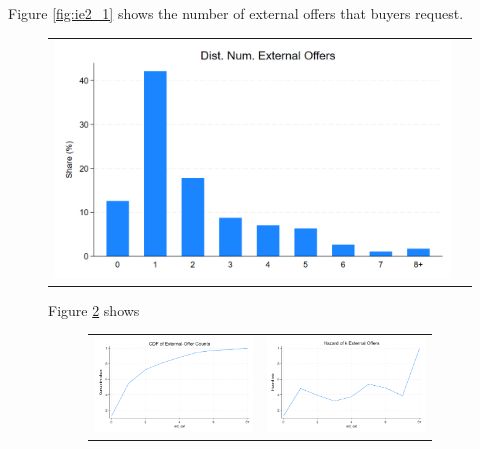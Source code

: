 \documentclass[12pt]{article}
\begin{document}
Figure \ref{fig:ie2_1} shows the number of external offers that buyers request.
\begin{figure}[H] \label{fig:ie2_1}
\caption{}
\centering{}%
\begin{tabular}{cc}
\includegraphics[scale=0.27]{figures/IE2_dist_external_offers.png}
\end{tabular}







Figure \ref{fig:ie2_2} shows 


\begin{figure}[H] \label{fig:ie2_2}
\caption{}
\centering{}%
\begin{tabular}{cc}
\includegraphics[scale=0.27]{figures/IE2_CDF_number_extoffers.png} &\includegraphics[scale=0.27]{figures/IE2_hazard_number_extoffers.png}


\end{tabular}
\end{figure}
\end{figure}
\end{document}
